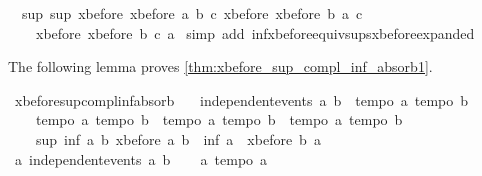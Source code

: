 \begin{isabellebody}
\ \ sup\ {\isacharparenleft}sup\ {\isacharparenleft}xbefore\ {\isacharparenleft}xbefore\ a\ b{\isacharparenright}\ c{\isacharparenright}\ {\isacharparenleft}xbefore\ {\isacharparenleft}xbefore\ b\ a{\isacharparenright}\ c{\isacharparenright}{\isacharparenright}\ \isanewline
\ \ \ \ {\isacharparenleft}xbefore\ {\isacharparenleft}xbefore\ b\ c{\isacharparenright}\ a{\isacharparenright}{\isachardoublequoteclose}\isanewline
%
\isadelimproof
%
\endisadelimproof
%
\isatagproof
{}\isamarkupfalse%
\ {\isacharparenleft}simp\ add{\isacharcolon}\ inf{\isacharunderscore}xbefore{\isacharunderscore}equiv{\isacharunderscore}sups{\isacharunderscore}xbefore{\isacharunderscore}expanded{\isacharparenright}%
\endisatagproof
{\isafoldproof}%
%
\isadelimproof
%
\endisadelimproof
%
\begin{isamarkuptext}%
The following lemma proves \cref{thm:xbefore_sup_compl_inf_absorb1}.%
\end{isamarkuptext}\isamarkuptrue%
\isamarkupfalse%
\ xbefore{\isacharunderscore}sup{\isacharunderscore}compl{\isacharunderscore}inf{\isacharunderscore}absorb{}{\isacharcolon}\ \isanewline
\ \ {\isachardoublequoteopen}independent{\isacharunderscore}events\ a\ b\ {\isasymLongrightarrow}\ {\isasymlbrakk}tempo{}\ a{\isacharsemicolon}\ tempo{}\ b{\isasymrbrakk}\ {\isasymLongrightarrow}\ \isanewline
\ \ \ \ {\isasymlbrakk}tempo{}\ a{\isacharsemicolon}\ tempo{}\ b{\isasymrbrakk}\ {\isasymLongrightarrow}\ {\isasymlbrakk}tempo{}\ a{\isacharsemicolon}\ tempo{}\ b{\isasymrbrakk}\ {\isasymLongrightarrow}\ {\isasymlbrakk}tempo{}\ a{\isacharsemicolon}\ tempo{}\ b{\isasymrbrakk}\ {\isasymLongrightarrow}\isanewline
\ \ \ \ sup\ {\isacharparenleft}inf\ a\ {\isacharparenleft}{\isacharminus}b{\isacharparenright}{\isacharparenright}\ {\isacharparenleft}xbefore\ a\ b{\isacharparenright}\ {\isacharequal}\ inf\ a\ {\isacharparenleft}{\isacharminus}\ {\isacharparenleft}xbefore\ b\ a{\isacharparenright}{\isacharparenright}{\isachardoublequoteclose}\isanewline
%
\isadelimproof
%
\endisadelimproof
%
\isatagproof
{}\isamarkupfalse%
\ {\isacharminus}\isanewline
\ \ \isamarkupfalse%
\ a{}{\isacharcolon}\ {\isachardoublequoteopen}independent{\isacharunderscore}events\ a\ b{\isachardoublequoteclose}\isanewline
\ \ \isamarkupfalse%
\ a{}{\isacharcolon}\ {\isachardoublequoteopen}tempo{}\ a{\isachardoublequoteclose}\isanewline
\ \ \isamarkupfalse%

\end{isabellebody}
